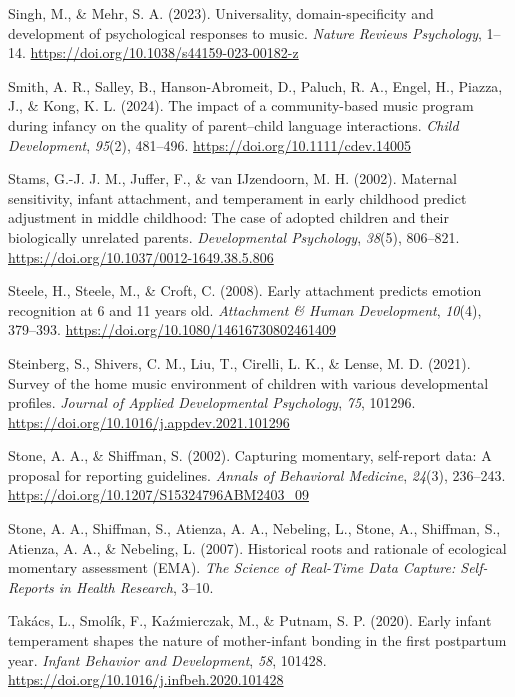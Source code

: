 \documentclass[
]{article}
\newlength{\cslhangindent}
\newenvironment{CSLReferences}[2] %
 {\begin{list}{}{%
  \setlength{\itemindent}{0pt}
  \setlength{\leftmargin}{0pt}
  \setlength{\parsep}{0pt}
  \ifodd #1
   \setlength{\leftmargin}{\cslhangindent}
   \setlength{\itemindent}{-1\cslhangindent}
  \fi
  \setlength{\itemsep}{#2\baselineskip}}}
 {\end{list}}
\begin{document}
\begin{CSLReferences}{1}{0}
Singh, M., \& Mehr, S. A. (2023). Universality, domain-specificity and
development of psychological responses to music. \emph{Nature Reviews
Psychology}, 1--14. \url{https://doi.org/10.1038/s44159-023-00182-z}

Smith, A. R., Salley, B., Hanson-Abromeit, D., Paluch, R. A., Engel, H.,
Piazza, J., \& Kong, K. L. (2024). The impact of a community-based music
program during infancy on the quality of parent--child language
interactions. \emph{Child Development}, \emph{95}(2), 481--496.
\url{https://doi.org/10.1111/cdev.14005}

Stams, G.-J. J. M., Juffer, F., \& van IJzendoorn, M. H. (2002).
Maternal sensitivity, infant attachment, and temperament in early
childhood predict adjustment in middle childhood: {The} case of adopted
children and their biologically unrelated parents. \emph{Developmental
Psychology}, \emph{38}(5), 806--821.
\url{https://doi.org/10.1037/0012-1649.38.5.806}

Steele, H., Steele, M., \& Croft, C. (2008). Early attachment predicts
emotion recognition at 6 and 11 years old. \emph{Attachment \& Human
Development}, \emph{10}(4), 379--393.
\url{https://doi.org/10.1080/14616730802461409}

Steinberg, S., Shivers, C. M., Liu, T., Cirelli, L. K., \& Lense, M. D.
(2021). Survey of the home music environment of children with various
developmental profiles. \emph{Journal of Applied Developmental
Psychology}, \emph{75}, 101296.
\url{https://doi.org/10.1016/j.appdev.2021.101296}

Stone, A. A., \& Shiffman, S. (2002). Capturing momentary, self-report
data: {A} proposal for reporting guidelines. \emph{Annals of Behavioral
Medicine}, \emph{24}(3), 236--243.
\url{https://doi.org/10.1207/S15324796ABM2403_09}

Stone, A. A., Shiffman, S., Atienza, A. A., Nebeling, L., Stone, A.,
Shiffman, S., Atienza, A. A., \& Nebeling, L. (2007). Historical roots
and rationale of ecological momentary assessment ({EMA}). \emph{The
Science of Real-Time Data Capture: Self-Reports in Health Research},
3--10.

Takács, L., Smolík, F., Kaźmierczak, M., \& Putnam, S. P. (2020). Early
infant temperament shapes the nature of mother-infant bonding in the
first postpartum year. \emph{Infant Behavior and Development},
\emph{58}, 101428. \url{https://doi.org/10.1016/j.infbeh.2020.101428}


\end{CSLReferences}
\end{document}
